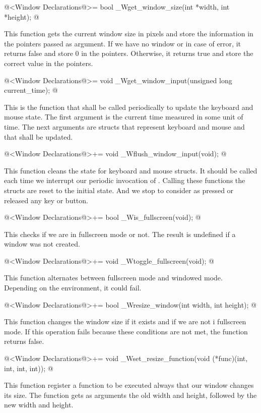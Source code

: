 \iniciocodigo
@<Window Declarations@>=
bool _Wget_window_size(int *width, int *height);
@
\fimcodigo

This function gets the current window size in pixels and store the
information in the pointers passed as argument. If we have no window
or in case of error, it returns false and store 0 in the
pointers. Otherwise, it returns true and store the correct value in
the pointers.

\iniciocodigo
@<Window Declarations@>=
void _Wget_window_input(unsigned long current_time);
@
\fimcodigo

This is the function that shall be called periodically to update the
keyboard and mouse state. The first argument is the current time
measured in some unit of time. The next arguments are structs that
represent keyboard and mouse and that shall be updated.

\iniciocodigo
@<Window Declarations@>+=
void _Wflush_window_input(void);
@
\fimcodigo

This function cleans the state for keyboard and mouse structs. It
should be called each time we interrupt our periodic invocation
of . Calling these functions the
structs are reset to the initial state. And we stop to consider as
pressed or released any key or button.

\iniciocodigo
@<Window Declarations@>+=
bool _Wis_fullscreen(void);
@
\fimcodigo

This checks if we are in fullscreen mode or not. The result is
undefined if a window was not created.

\iniciocodigo
@<Window Declarations@>+=
void _Wtoggle_fullscreen(void);
@
\fimcodigo

This function alternates between fullscreen mode and windowed
mode. Depending on the environment, it could fail.

\iniciocodigo
@<Window Declarations@>+=
bool _Wresize_window(int width, int height);
@
\fimcodigo

This function changes the window size if it exists and if we are not i
fullscreen mode. If this operation fails because these conditions are
not met, the function returns false.

\iniciocodigo
@<Window Declarations@>+=
void _Wset_resize_function(void (*func)(int, int, int, int));
@
\fimcodigo

This function register a function to be executed always that our
window changes its size. The function gets as arguments the old width
and height, followed by the new width and height.

